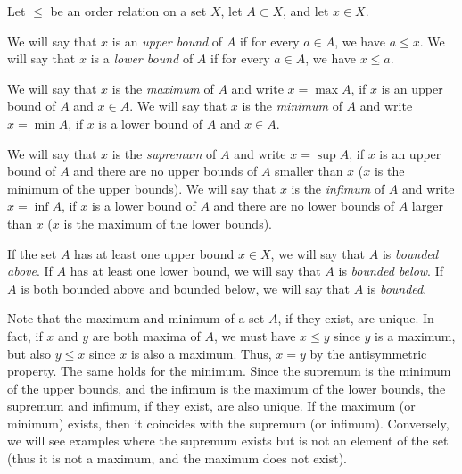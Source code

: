 \begin{definition}
  \label{def:massimo}%
  \label{def:minimo}%
  \label{def:maggiorante}%
  \label{def:minorante}%
  \label{def:sup}%
  \label{def:inf}%
    Let $\le$ be an order relation on a set $X$, let $A\subset X$, and let $x\in
  X$.

    We will say that $x$ is an \emph{upper bound} of $A$ if for every $a\in A$,
  we have $a\le x$.
    We will say that $x$ is a \emph{lower bound} of $A$ if for every $a\in A$,
  we have $x\le a$.
  
  We will say that $x$ is the \emph{maximum} of $A$ 
  and write $x=\max A$,
  if $x$ is an upper bound of $A$ and $x\in A$.
  We will say that $x$ is the \emph{minimum} of $A$ 
  and write $x=\min A$,
  if $x$ is a lower bound of $A$ and $x\in A$.
  
  We will say that $x$ is the \emph{supremum} of $A$ 
  and write $x=\sup A$,
  if $x$ is an upper bound of $A$
  and there are no upper bounds of $A$ smaller than $x$
  ($x$ is the minimum of the upper bounds).
  We will say that $x$ is the \emph{infimum} of $A$ 
  and write $x=\inf A$,
  if $x$ is a lower bound of $A$
  and there are no lower bounds of $A$ larger than $x$
  ($x$ is the maximum of the lower bounds).

  If the set $A$ has at least one upper bound $x\in X$, we will say that $A$ 
  is \emph{bounded above}. 
    If $A$ has at least one lower bound, we will say that $A$ is \emph{bounded
  below}.
    If $A$ is both bounded above and bounded below, we will say that $A$ is
  \emph{bounded}.
\end{definition}

Note that the maximum and minimum of a set $A$, if they exist, are unique. In
fact, if $x$ and $y$ are both maxima of $A$, we must have $x\le y$ since $y$ is
a maximum, but also $y\le x$ since $x$ is also a maximum. Thus, $x=y$ by the
antisymmetric property. The same holds for the minimum. Since the supremum is
the minimum of the upper bounds, and the infimum is the maximum of the lower
bounds, the supremum and infimum, if they exist, are also unique. If the maximum
(or minimum) exists, then it coincides with the supremum (or infimum).
Conversely, we will see examples where the supremum exists but is not an element
of the set (thus it is not a maximum, and the maximum does not exist).

